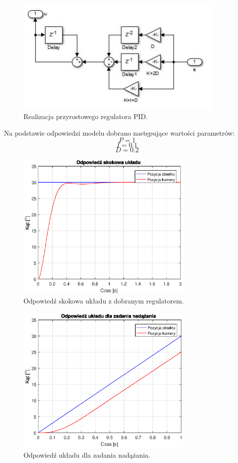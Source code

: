 \begin{figure}[h]
	\centering
	\includegraphics[width=4in]{Przyrostowy.jpg}
	\caption{Realizacja przyrostowego regulatora PID.}
	\label{fig:przyrostowy}
\end{figure}

Na podstawie odpowiedzi modelu dobrano następujące wartości parametrów:
\begin{equation}
P=1
\end{equation}
\begin{equation}
I=0.1
\end{equation}
\begin{equation}
D=0.2
\end{equation}

\begin{figure}[H]
	\centering
	\includegraphics[width=3.4in]{sim_step.eps}
	\caption{Odpowiedź skokowa układu z dobranym regulatorem.}
\label{fig:sim_step}
\end{figure}

\begin{figure}[H]
	\centering
	\includegraphics[width=3.4in]{sim_ramp.eps}
	\caption{Odpowiedź układu dla zadania nadążania.}
\label{fig:sim_ramp}
\end{figure}

